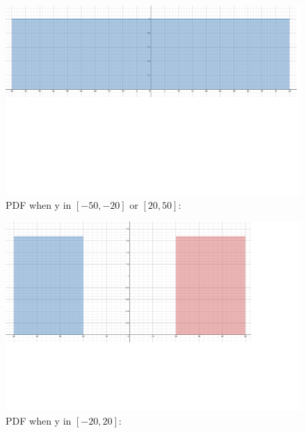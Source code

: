 \documentclass[12pt,twoside]{article}
\begin{document}
\begin{enumerate}
\begin{enumerate}
\begin{figure}[h!]
    \centering
    \includegraphics[scale=.2]{image2.png}
    \caption{PDF when y in $[-50,-20]$ or $[20,50]$:}
    \label{fig:my_label}
\end{figure}

\begin{figure}[h!]
    \centering
    \includegraphics[scale=.2]{image3.png}
    \caption{PDF when y in $[-20,20]$:}
    \label{fig:my_label}
\end{figure}

\newpage


\end{enumerate}
\end{enumerate}
\end{document}
